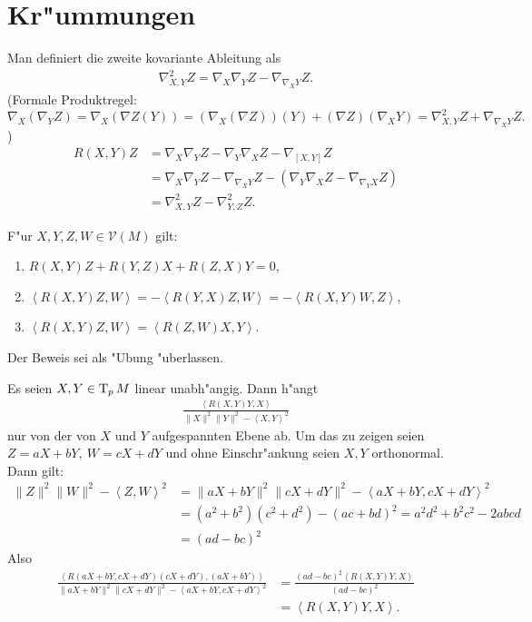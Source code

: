 \section{Kr"ummungen}

Man definiert die zweite kovariante Ableitung als
\begin{align*}
  \nabla_{X,Y}^2Z = \nabla_X\nabla_YZ - \nabla_{\nabla_XY}Z.
\end{align*}
(Formale Produktregel: $\nabla_X(\nabla_YZ) = \nabla_X(\nabla Z(Y)) = (\nabla_X(\nabla Z))(Y) + (\nabla Z)(\nabla_XY) = \nabla_{X,Y}^2Z + \nabla_{\nabla_XY}Z.$)
\begin{align*}
  R(X,Y)Z & = \nabla_X\nabla_YZ - \nabla_Y\nabla_XZ - \nabla_{[X,Y]}Z\\
  & = \nabla_X\nabla_YZ - \nabla_{\nabla_XY}Z - (\nabla_Y\nabla_XZ - \nabla_{\nabla_YX}Z)\\
  & = \nabla_{X,Y}^2Z - \nabla_{Y,Z}^2Z.
\end{align*}

\begin{Prop}
  F"ur $X,Y,Z,W \in \mathcal V(M)$ gilt:
  \begin{enumerate}[label=(\roman*)]
  \item
    $R(X,Y)Z + R(Y,Z)X + R(Z,X)Y = 0$,
  \item
    $\left<R(X,Y)Z,W\right> = -\left<R(Y,X)Z,W\right> = - \left<R(X,Y)W,Z\right>$,
  \item
    $\left<R(X,Y)Z,W\right> = \left<R(Z,W)X,Y\right>$.
  \end{enumerate}\end{Prop}

Der Beweis sei als "Ubung "uberlassen.

Es seien $X,Y \in \operatorname{T}_pM$ linear unabh"angig. Dann h"angt
\begin{align*}
  \frac{\left<R(X,Y)Y,X\right>}{\|X\|^2\|Y\|^2 - \left<X,Y\right>^2}
\end{align*}
nur von der von $X$ und $Y$ aufgespannten Ebene ab.
Um das zu zeigen seien $Z = aX + bY, \ W = cX + dY$ und ohne Einschr"ankung seien $X,Y$ orthonormal.
Dann gilt:
\begin{align*}
  \|Z\|^2\|W\|^2 - \left<Z,W\right>^2 & = \|aX + bY\|^2\|cX + dY\|^2 - \left<aX + bY, cX + dY\right>^2\\
  & = (a^2 + b^2)(c^2 + d^2) - (ac + bd)^2 = a^2d^2 + b^2c^2 - 2abcd\\
  & = (ad - bc)^2
\end{align*}
Also
\begin{align*}
  \frac{\left<R(aX+bY,cX+dY)(cX+dY),(aX+bY)\right>}{\|aX+bY\|^2\|cX+dY\|^2 - \left<aX+bY, cX+dY\right>^2} & = \frac{(ad-bc)^2\left<R(X,Y)Y,X\right>}{(ad-bc)^2}\\
  & = \left<R(X,Y)Y,X\right>.
\end{align*}

